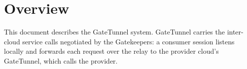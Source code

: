 \documentclass[a4paper]{arrowhead}
\begin{document}
\sloppy

\ArrowheadSetup

\begin{center}
  \vspace*{1cm}
  \huge{\arrowtitle}

  \vspace*{0.2cm}
  \LARGE{\arrowtype}
  \vspace*{1cm}

  \vspace*{\fill}


  \vspace*{1cm}
  \vspace*{\fill}

  \begin{abstract}
    This document describes the GateTunnel support system of the Eclipse Arrowhead 5.2.2 framework, as implemented in \texttt{ah5-GateTunnel-java-spring} with an independent local-cloud deployment definition in its own folder.
  \end{abstract}

  \vspace*{1cm}
\end{center}

\newpage

\tableofcontents
\newpage

\section{Overview}
\label{sec:overview}

This document describes the GateTunnel system. GateTunnel carries the inter-cloud service calls negotiated by the Gatekeepers: a consumer session listens locally and forwards each request over the relay to the provider cloud's GateTunnel, which calls the provider.
\end{document}
